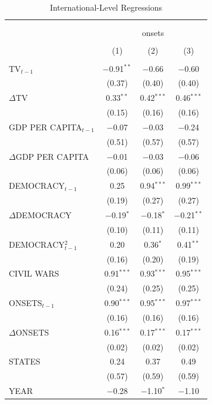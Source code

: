 \documentclass[11pt,article,oneside]{memoir}
\begin{document}
\begin{table}[!htbp] \centering 
  \caption{International-Level Regressions} 
  \label{} 
\scriptsize 
\begin{tabular}{@{\extracolsep{5pt}}lccc} 
\\[-1.8ex]\hline \\[-1.8ex] 
\\[-1.8ex] & \multicolumn{3}{c}{onsets} \\ 
\\[-1.8ex] & (1) & (2) & (3)\\ 
\hline \\[-1.8ex] 
 TV$_{t-1}$ & $-$0.91$^{**}$ & $-$0.66 & $-$0.60 \\ 
  & (0.37) & (0.40) & (0.40) \\ 
  $\Delta$TV & 0.33$^{**}$ & 0.42$^{***}$ & 0.46$^{***}$ \\ 
  & (0.15) & (0.16) & (0.16) \\ 
  GDP PER CAPITA$_{t-1}$ & $-$0.07 & $-$0.03 & $-$0.24 \\ 
  & (0.51) & (0.57) & (0.57) \\ 
  $\Delta$GDP PER CAPITA & $-$0.01 & $-$0.03 & $-$0.06 \\ 
  & (0.06) & (0.06) & (0.06) \\ 
  DEMOCRACY$_{t-1}$ & 0.25 & 0.94$^{***}$ & 0.99$^{***}$ \\ 
  & (0.19) & (0.27) & (0.27) \\ 
  $\Delta$DEMOCRACY & $-$0.19$^{*}$ & $-$0.18$^{*}$ & $-$0.21$^{**}$ \\ 
  & (0.10) & (0.11) & (0.11) \\ 
  DEMOCRACY$^2_{t-1}$ & 0.20 & 0.36$^{*}$ & 0.41$^{**}$ \\ 
  & (0.16) & (0.20) & (0.19) \\ 
  CIVIL WARS & 0.91$^{***}$ & 0.93$^{***}$ & 0.95$^{***}$ \\ 
  & (0.24) & (0.25) & (0.25) \\ 
  ONSETS$_{t-1}$ & 0.90$^{***}$ & 0.95$^{***}$ & 0.97$^{***}$ \\ 
  & (0.16) & (0.16) & (0.16) \\ 
  $\Delta$ONSETS & 0.16$^{***}$ & 0.17$^{***}$ & 0.17$^{***}$ \\ 
  & (0.02) & (0.02) & (0.02) \\ 
  STATES & 0.24 & 0.37 & 0.49 \\ 
  & (0.57) & (0.59) & (0.59) \\ 
  YEAR & $-$0.28 & $-$1.10$^{*}$ & $-$1.10 \\ 

\end{tabular}
\end{table}
\end{document}
